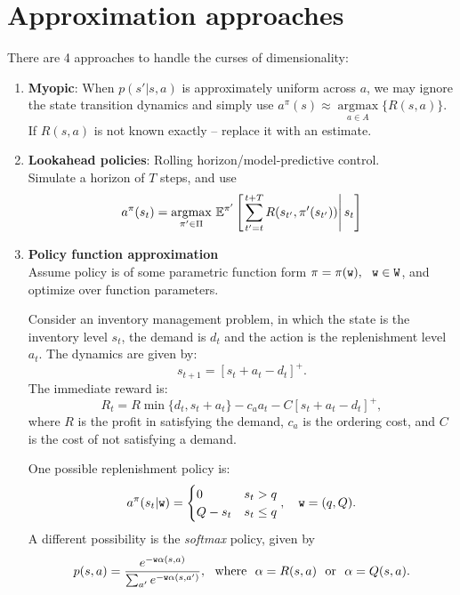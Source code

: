 \section{Approximation approaches}
There are 4 approaches to handle the curses of dimensionality:
\begin{enumerate}
\item \textbf{Myopic}: When $p(s'|s,a)$ is approximately uniform across $a$, we may ignore the state transition dynamics and simply use $a^\pi(s)\approx \underset{a \in A}{\operatorname{argmax}} \{R(s,a)\}$. If $R(s,a)$ is not known exactly -- replace it with an estimate.

\item \textbf{Lookahead policies}: Rolling horizon/model-predictive control.\\
Simulate a horizon of $T$ steps, and use
$$a^\pi(s_t) = \underset{\pi' \in \Pi}{\operatorname{argmax}}\  \mathbb{E}^{\pi'} \left[\left.\sum_{t'=t}^{t+T} R(s_{t'},\pi'(s_{t'}))\right|s_t\right]$$

\item \textbf{Policy function approximation}\\
Assume policy is of some parametric function form $\pi = \pi(\texttt{w}), \ \ \texttt{w} \in \mathtt{W}$, and optimize over function parameters.\\
\begin{example}
Consider an inventory management problem, in which the state is the inventory level $s_t$, the demand is $d_t$ and the action is the replenishment level $a_t$. The dynamics are given by:
$$s_{t+1} = [s_t + a_t-d_t]^+.$$
The immediate reward is:
$$R_t = R \min\{d_t,s_t+a_t\} - c_a a_t -C[s_t + a_t-d_t]^+,$$
where $R$ is the profit in satisfying the demand, $c_a$ is the ordering cost, and $C$ is the cost of not satisfying a demand.

One possible replenishment policy is:
$$a^\pi(s_t|\weights) = \begin{cases} 0 & s_t > q\\Q-s_t & s_t \le q \end{cases}, \ \ \ \weights=(q,Q).$$
A different possibility is the \emph{softmax} policy, given by
$$p(s,a) = \frac{e^{-\weights\alpha(s,a)}}{\sum_{a'} e^{-\weights\alpha(s,a')}}, \ \ \mathrm{where}\ \ \alpha=R(s,a)\ \ \mathrm{or} \ \ \alpha=Q(s,a).$$
\end{example}


\end{enumerate}

